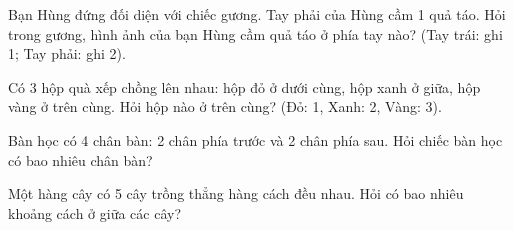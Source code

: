 \begin{ex} %
Bạn Hùng đứng đối diện với chiếc gương. Tay phải của Hùng cầm 1 quả táo. Hỏi trong gương, hình ảnh của bạn Hùng cầm quả táo ở phía tay nào? (Tay trái: ghi 1; Tay phải: ghi 2).
\end{ex}

\begin{ex} %
Có 3 hộp quà xếp chồng lên nhau: hộp đỏ ở dưới cùng, hộp xanh ở giữa, hộp vàng ở trên cùng. Hỏi hộp nào ở trên cùng? (Đỏ: 1, Xanh: 2, Vàng: 3).
\end{ex}

\begin{ex} %
Bàn học có 4 chân bàn: 2 chân phía trước và 2 chân phía sau. Hỏi chiếc bàn học có bao nhiêu chân bàn?
\end{ex}

\begin{ex} %
Một hàng cây có 5 cây trồng thẳng hàng cách đều nhau. Hỏi có bao nhiêu khoảng cách ở giữa các cây?
\end{ex}
